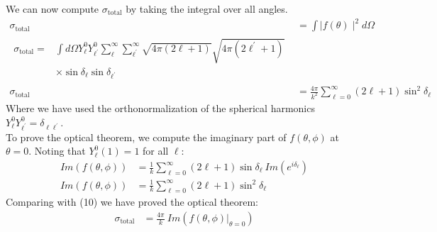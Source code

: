 \documentclass[a4paper,11pt]{article}
\numberwithin{equation}{section}
\begin{document}
We can now compute $\sigma_{\text{total}}$ by taking the integral over all angles.
\begin{align}
 \sigma_{\text{total}} &= \int \mid f(\theta)\mid^2 d\Omega\\
 \begin{split}
 \sigma_{\text{total}} = &\int d\Omega Y_\ell^0 Y_{\ell^\prime}^0 \sum_\ell^\infty \sum_{\ell^\prime}^\infty \sqrt{4\pi(2\ell+1)}\sqrt{4\pi(2\ell^\prime+1)}\\
			  &\times \sin{\delta_\ell}\sin{\delta_{\ell^\prime}}
 \end{split}\\
 \sigma_{\text{total}} &= \frac{4\pi}{k^2}\sum_{\ell=0}^\infty (2\ell+1)\sin^2{\delta_\ell}
\end{align}
Where we have used the orthonormalization of the spherical harmonics $Y_\ell^0Y_{\ell^\prime}^0=\delta_{\ell\ell^\prime} $.\\
To prove the optical theorem, we compute the imaginary part of $f(\theta,\phi)$ at $\theta=0$.
Noting that $Y_\ell^0(1)=1$ for all $\ell$:
\begin{align}
 Im\left(f(\theta,\phi)\right) &= \frac{1}{k}\sum_{\ell=0}^\infty (2\ell+1)\sin{\delta_\ell}\ Im\left(e^{i\delta_\ell}\right)\\
 Im\left(f(\theta,\phi)\right) &= \frac{1}{k}\sum_{\ell=0}^\infty (2\ell+1)\sin^2{\delta_\ell}
\end{align}
Comparing with (10) we have proved the optical theorem:
\begin{align}
 \sigma_{\text{total}} &= \frac{4\pi}{k}\ Im\left(f(\theta,\phi)|_{\theta=0} \right)
\end{align}
\end{document}
